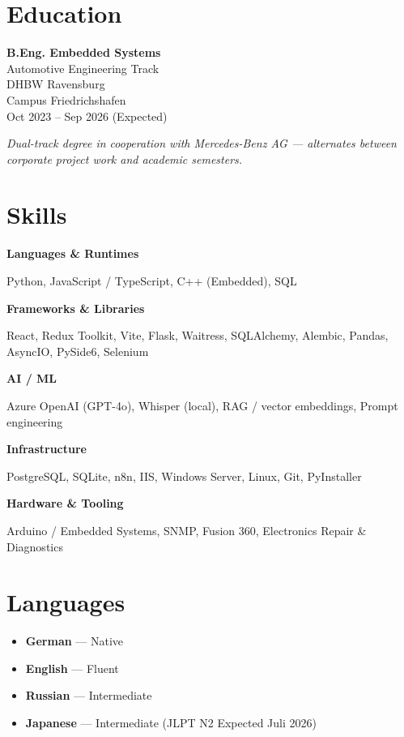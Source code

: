 \documentclass[10pt, a4paper]{article}
\newcommand{\skill}[2]{%
  \textbf{#1}\\[0.15em]
  {\raggedright #2\par}
}
\begin{document}
\begin{minipage}[t]{0.32\linewidth}

\section{Education}

\textbf{B.Eng. Embedded Systems}\\
\textcolor{subtle}{\small Automotive Engineering Track}\\
\textcolor{subtle}{\small DHBW Ravensburg}\\
\textcolor{subtle}{\small Campus Friedrichshafen}\\
\textcolor{subtle}{\small Oct 2023 – Sep 2026 (Expected)}

\vspace{0.5em}

\textit{\footnotesize\textcolor{subtle}{Dual-track degree in cooperation with Mercedes-Benz AG — alternates between corporate project work and academic semesters.}}

\vspace{0.5em}

\section{Skills}

\skill{Languages \& Runtimes}{Python, JavaScript / TypeScript, C++ (Embedded), SQL}

\vspace{0.4em}
\skill{Frameworks \& Libraries}{React, Redux Toolkit, Vite, Flask, Waitress, SQLAlchemy, Alembic, Pandas, AsyncIO, PySide6, Selenium}

\vspace{0.4em}
\skill{AI / ML}{Azure OpenAI (GPT-4o), Whisper (local), RAG / vector embeddings, Prompt engineering}

\vspace{0.4em}
\skill{Infrastructure}{PostgreSQL, SQLite, n8n, IIS, Windows Server, Linux, Git, PyInstaller}

\vspace{0.4em}
\skill{Hardware \& Tooling}{Arduino / Embedded Systems, SNMP, Fusion 360, Electronics Repair \& Diagnostics}

\section{Languages}

\begin{itemize}[leftmargin=0.8em]
  \item \textbf{German} — Native
  \item \textbf{English} — Fluent
  \item \textbf{Russian} — Intermediate
  \item \textbf{Japanese} — Intermediate (JLPT N2 Expected Juli 2026)
\end{itemize}

\end{minipage}
\end{document}
